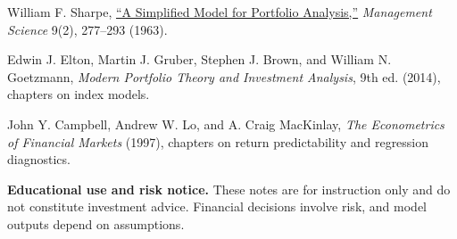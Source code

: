 \documentclass[11pt]{article}
\begin{document}
\begin{readinglist}
  \item William F. Sharpe, \href{https://doi.org/10.1287/mnsc.9.2.277}{``A Simplified Model for Portfolio Analysis,''} \emph{Management Science} 9(2), 277--293 (1963).
  \item Edwin J. Elton, Martin J. Gruber, Stephen J. Brown, and William N. Goetzmann, \emph{Modern Portfolio Theory and Investment Analysis}, 9th ed. (2014), chapters on index models.
  \item John Y. Campbell, Andrew W. Lo, and A. Craig MacKinlay, \emph{The Econometrics of Financial Markets} (1997), chapters on return predictability and regression diagnostics.
\end{readinglist}

\vfill
{\sffamily\footnotesize\color{vnmuted}\textbf{Educational use and risk notice.} These notes are for instruction only and do not constitute investment advice. Financial decisions involve risk, and model outputs depend on assumptions.}
\end{document}
